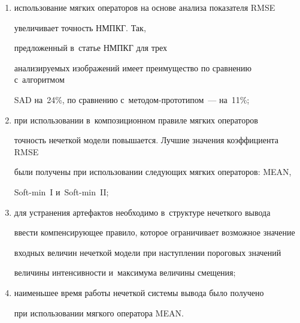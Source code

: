   \begin{enumerate}[(1)]


  \item использование мягких операторов на основе анализа показателя RMSE 


увеличивает точность НМПКГ. Так, 


предложенный в~статье НМПКГ для трех 


анализируемых изображений имеет преимущество по сравнению с~алгоритмом 


SAD на~24\%, по сравнению с~методом-прототипом~--- на~11\%;


  \item при использовании в~композиционном правиле мягких операторов 


точность нечеткой модели повышается. Лучшие значения коэффициента RMSE 


были получены при использовании следующих мягких операторов: MEAN, 


Soft-min~I и~Soft-min~II;


  \item для устранения артефактов необходимо в~структуре нечеткого вывода 


ввес\-ти компенсирующее правило, которое ограничивает возможное значение 


входных величин нечеткой модели при наступлении пороговых значений 


величины интенсивности и~максимума величины смещения;


  \item наименьшее время работы нечеткой системы вывода было получено 


при использовании мягкого оператора MEAN.


  \end{enumerate}


  


